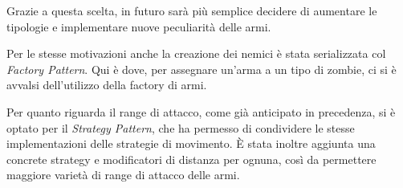 \documentclass[a4paper,titlepage,12pt]{article}
\begin{document}
\par \noindent Grazie a questa scelta, in futuro sarà più semplice decidere di aumentare le tipologie e implementare nuove peculiarità delle armi.
\par \noindent Per le stesse motivazioni anche la creazione dei nemici è stata serializzata col \textit{Factory Pattern}. Qui è dove, per assegnare un'arma a un tipo di zombie, ci si è avvalsi dell'utilizzo della factory di armi.
\par \noindent Per quanto riguarda il range di attacco, come già anticipato in precedenza, si è optato per il \textit{Strategy Pattern}, che ha permesso di condividere le stesse implementazioni delle strategie di movimento. È stata inoltre aggiunta una concrete strategy e modificatori di distanza per ognuna, così da permettere maggiore varietà di range di attacco delle armi.
\newpage
\end{document}
